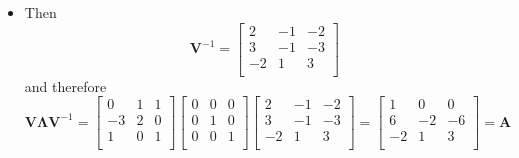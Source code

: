 \documentclass[12pt,a4paper]{article}
\begin{document}
\begin{itemize}
\begin{itemize}
  \item Then
    \begin{equation}\nonumber%
      \bm{V}^{-1}
      =
      \begin{bmatrix}
        2 & -1 & -2 \\
        3 & -1 & -3 \\
        -2 & 1 & 3 \\
      \end{bmatrix}
    \end{equation}
    and therefore
    \begin{equation}\nonumber%
      \bm{V}\bm{\Lambda}\bm{V}^{-1}
      = 
      \begin{bmatrix}
        0 & 1 & 1 \\
        -3 & 2 & 0\\
        1 & 0 & 1 \\
      \end{bmatrix}
      \begin{bmatrix}
        0 & 0 & 0 \\
        0 & 1 & 0 \\
        0 & 0 & 1 \\
      \end{bmatrix}
      \begin{bmatrix}
        2 & -1 & -2 \\
        3 & -1 & -3 \\
        -2 & 1 & 3 \\
      \end{bmatrix}
      =
      \begin{bmatrix}
        1 & 0 & 0 \\
        6 & -2 & -6 \\
        -2 & 1 & 3 \\
      \end{bmatrix}
      = \bm{A}
    \end{equation}
  \end{itemize}


\end{itemize}
\end{document}
